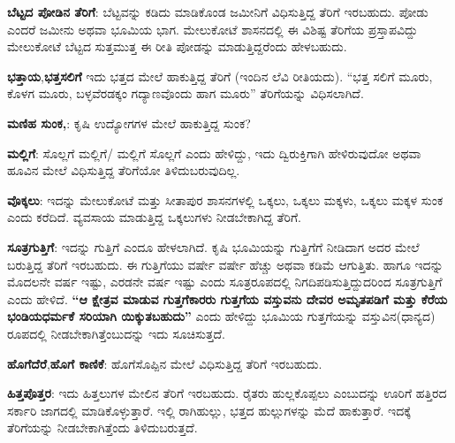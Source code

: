 \textbf{ಬೆಟ್ಟದ ಪೋಡಿನ ತೆರಿಗೆ}: ಬೆಟ್ಟವನ್ನು ಕಡಿದು ಮಾಡಿಕೊಂಡ ಜಮೀನಿಗೆ ವಿಧಿಸುತ್ತಿದ್ದ ತೆರಿಗೆ ಇರಬಹುದು. ಪೋಡು ಎಂದರೆ ಜಮೀನು ಅಥವಾ ಭೂಮಿಯ ಭಾಗ. ಮೇಲುಕೋಟೆ ಶಾಸನದಲ್ಲಿ ಈ ವಿಶಿಷ್ಟ ತೆರಿಗೆಯ ಪ್ರಸ್ತಾಪವಿದ್ದು ಮೇಲುಕೋಟೆ ಬೆಟ್ಟದ ಸುತ್ತಮುತ್ತ ಈ ರೀತಿ ಪೋಡನ್ನು ಮಾಡುತ್ತಿದ್ದರೆಂದು ಹೇಳಬಹುದು.

\textbf{ಭತ್ತಾಯ},\textbf{ಭತ್ತಸಲಿಗೆ} ಇದು ಭತ್ತದ ಮೇಲೆ ಹಾಕುತ್ತಿದ್ದ ತೆರಿಗೆ (ಇಂದಿನ ಲೆವಿ ರೀತಿಯದು). “ಭತ್ತ ಸಲಿಗೆ ಮೂರು, ಕೊಳಗ ಮೂರು, ಬಳ್ಳವೆರಡಕ್ಕಂ ಗದ್ಯಾಣವೊಂದು ಹಾಗ ಮೂರು” ತೆರಿಗೆಯನ್ನು ವಿಧಿಸಲಾಗಿದೆ.

\textbf{ಮಣಿಹ ಸುಂಕ,}: ಕೃಷಿ ಉದ್ಯೋಗಗಳ ಮೇಲೆ ಹಾಕುತ್ತಿದ್ದ ಸುಂಕ?

\textbf{ಮಲ್ಲಿಗೆ}: ಸೊಲ್ಲಗೆ ಮಲ್ಲಿಗೆ/ ಮಲ್ಲಿಗೆ ಸೊಲ್ಲಗೆ ಎಂದು ಹೇಳಿದ್ದು, ಇದು ದ್ವಿರುಕ್ತಿಗಾಗಿ ಹೇಳಿರುವುದೋ ಅಥವಾ ಹೂವಿನ ಮೇಲೆ ವಿಧಿಸುತ್ತಿದ್ದ ತೆರಿಗೆಯೋ ತಿಳಿದುಬರುವುದಿಲ್ಲ.

\textbf{ವೊಕ್ಕಲು}: ಇದನ್ನು ಮೇಲುಕೋಟೆ ಮತ್ತು ಸೀತಾಪುರ ಶಾಸನಗಳಲ್ಲಿ ಒಕ್ಕಲು, ಒಕ್ಕಲು ಮಕ್ಕಳು, ಒಕ್ಕಲು ಮಕ್ಕಳ ಸುಂಕ ಎಂದು ಕರೆದಿದೆ. ವ್ಯವಸಾಯ ಮಾಡುತ್ತಿದ್ದ ಒಕ್ಕಲುಗಳು ನೀಡಬೇಕಾಗಿದ್ದ ತೆರಿಗೆ.

\textbf{ಸೂತ್ರಗುತ್ತಿಗೆ}: ಇದನ್ನು ಗುತ್ತಿಗೆ ಎಂದೂ ಹೇಳಲಾಗಿದೆ. ಕೃಷಿ ಭೂಮಿಯನ್ನು ಗುತ್ತಿಗೆಗೆ ನೀಡಿದಾಗ ಅದರ ಮೇಲೆ ಬರುತ್ತಿದ್ದ ತೆರಿಗೆ ಇರಬಹುದು. ಈ ಗುತ್ತಿಗೆಯು ವರ್ಷೇ ವರ್ಷೇ ಹೆಚ್ಚು ಅಥವಾ ಕಡಿಮೆ ಆಗುತ್ತಿತು. ಹಾಗೂ ಇದನ್ನು ಮೊದಲನೇ ವರ್ಷ ಇಷ್ಟು, ಎರಡನೇ ವರ್ಷ ಇಷ್ಟು ಎಂದು ಸೂತ್ರರೂಪದಲ್ಲಿ ನಿಗದಿಪಡಿಸುತ್ತಿದ್ದುದರಿಂದ ಸೂತ್ರಗುತ್ತಿಗೆ ಎಂದು ಹೇಳಿದೆ.\textbf{ “ಆ ಕ್ಷೇತ್ರವ ಮಾಡುವ ಗುತ್ತಗೆಕಾರರು ಗುತ್ತಗೆಯ ವಸ್ತುವನು ದೇವರ ಅಮೃತಪಡಿಗೆ ಮತ್ತು ಕೆರೆಯ ಭಂಡಿಯಧರ್ಮಕೆ ಸರಿಯಾಗಿ ಯಿಕ್ಕುತಬಹುದು” }ಎಂದು ಹೇಳಿದ್ದು ಭೂಮಿಯ ಗುತ್ತಗೆಯನ್ನು ವಸ್ತುವಿನ(ಧಾನ್ಯದ) ರೂಪದಲ್ಲಿ ನೀಡಬೇಕಾಗಿತ್ತೆಂಬುದನ್ನು ಇದು ಸೂಚಿಸುತ್ತದೆ.

\textbf{ಹೊಗೆದೆರೆ},\textbf{ಹೊಗೆ ಕಾಣಿಕೆ}: ಹೊಗೆಸೊಪ್ಪಿನ ಮೇಲೆ ವಿಧಿಸುತ್ತಿದ್ದ ತೆರಿಗೆ ಇರಬಹುದು.

\textbf{ಹಿತ್ತಪೊತ್ತರ}: ಇದು ಹಿತ್ತಲುಗಳ ಮೇಲಿನ ತೆರಿಗೆ ಇರಬಹುದು. ರೈತರು ಹುಲ್ಲಕೊಪ್ಪಲು ಎಂಬುದನ್ನು ಊರಿಗೆ ಹತ್ತಿರದ ಸರ್ಕಾರಿ ಜಾಗದಲ್ಲಿ ಮಾಡಿಕೊಳ್ಳುತ್ತಾರೆ. ಇಲ್ಲಿ ರಾಗಿಹುಲ್ಲು, ಭತ್ತದ ಹುಲ್ಲುಗಳನ್ನು ಮೆದೆ ಹಾಕುತ್ತಾರೆ. ಇದಕ್ಕೆ ತೆರಿಗೆಯನ್ನು ನೀಡಬೇಕಾಗಿತ್ತೆಂದು ತಿಳಿದುಬರುತ್ತದೆ.

